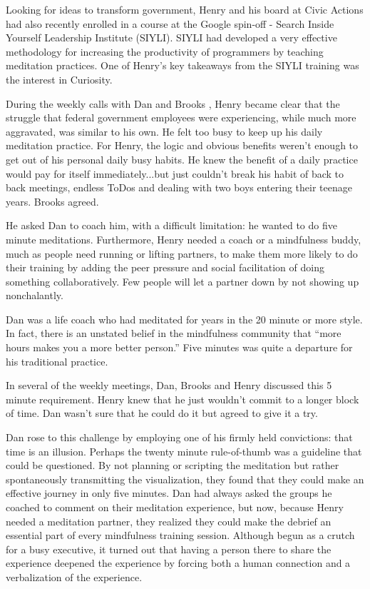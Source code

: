 \documentclass[12pt]{book}
\begin{document}
Looking for ideas to transform government, Henry and his board at Civic Actions had also recently enrolled in a course at the Google spin-off - Search Inside Yourself Leadership Institute (SIYLI). SIYLI had developed a very effective methodology for increasing the productivity of programmers by teaching meditation practices. One of Henry’s key takeaways from the SIYLI training was the interest in Curiosity.
					
During the weekly calls with Dan and Brooks , Henry became clear that the struggle that federal government employees were experiencing, while much more aggravated, was similar to his own. He felt too busy to keep up his daily meditation practice. For Henry, the logic and obvious benefits weren’t enough to get out of his personal daily busy habits. He knew the benefit of a daily practice would pay for itself immediately...but just couldn’t break his habit of back to back meetings, endless ToDos and dealing with two boys entering their teenage years. Brooks agreed.
					
He asked Dan to coach him, with a difficult limitation: he wanted to do five minute meditations. Furthermore, Henry needed a coach or a mindfulness buddy, much as people need running or lifting partners, to make them more likely to do their training by adding the peer pressure and social facilitation of doing something collaboratively. Few people will let a partner down by not showing up nonchalantly.
					
Dan was a life coach who had meditated for years in the 20 minute or more style. In fact, there is an unstated belief in the mindfulness community that “more hours makes you a more better person.” Five minutes was quite a departure for his traditional practice.
					
In several of the weekly meetings, Dan, Brooks and Henry discussed this 5 minute requirement. Henry knew that he just wouldn’t commit to a longer block of time. Dan wasn’t sure that he could do it but agreed to give it a try.
					
Dan rose to this challenge by employing one of his firmly held convictions: that time is an illusion. Perhaps the twenty minute rule-of-thumb was a guideline that could be questioned. By not planning or scripting the meditation but rather spontaneously transmitting the visualization, they found that they could make an effective journey in only five minutes. Dan had always asked the groups he coached to comment on their meditation experience, but now, because Henry needed a meditation partner, they realized they could make the debrief an essential part of every mindfulness training session. Although begun as a crutch for a busy executive, it turned out that having a person there to share the experience deepened the experience by forcing both a human connection and a verbalization of the experience.
					
\end{document}
